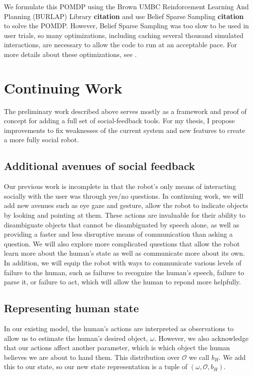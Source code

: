 \documentclass{article}
\begin{document}
We formulate this POMDP using the Brown UMBC Reinforcement Learning And Planning (BURLAP) Library \textbf{citation} and use Belief Sparse Sampling \textbf{citation} to solve the POMDP. However, Belief Sparse Sampling was too slow to be used in user trials, so many optimizations, including caching several thousand simulated interactions, are necessary to allow the code to run at an acceptable pace. For more details about these optimizations, see \citet{socialfeedback}. 


\section{Continuing Work}


The preliminary work described above serves mostly as a framework and proof of concept for adding a full set of social-feedback tools. For my thesis, I propose improvements to fix weaknesses of the current system and new features to create a more fully social robot.  

\subsection{Additional avenues of social feedback}

Our previous work is incomplete in that the robot's only means of interacting socially with the user was through yes/no questions. In continuing work, we will add new avenues such as eye gaze and gesture, allow the robot to indicate objects by looking and pointing at them. These actions are invaluable for their ability to disambiguate objects that cannot be disambiguated by speech alone, as well as providing a faster and less disruptive means of communication than asking a question. We will also explore more complicated questions that allow the robot learn more about the human's state as well as communicate more about its own. In addition, we will equip the robot with ways to communicate various levels of failure to the human, such as failures to recognize the human's speech, failure to parse it, or failure to act, which will allow the human to repond more helpfully. 

\subsection{Representing human state}

In our existing model, the human's actions are interpreted as observations to allow us to estimate the human's desired object, $\omega$. However, we also acknowledge that our actions affect another parameter, which is which object the human believes we are about to hand them. This distribution over $\mathcal{O}$ we call $b_H$. We add this to our state, so our new state representation is a tuple of $(\omega, \mathcal{O}, b_H)$. 
\end{document}
